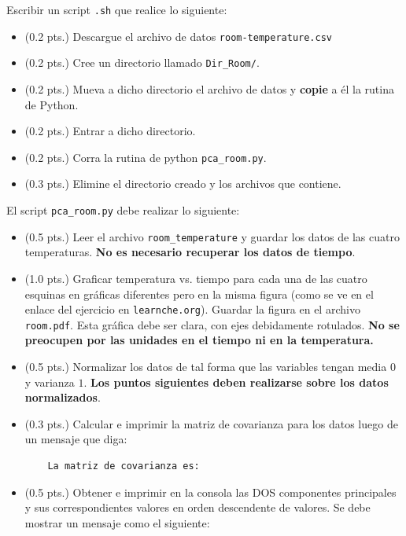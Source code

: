 \documentclass[11pt,letterpaper]{exam}
\begin{document}
\begin{questions}
 
\question[1.3]

Escribir un script \verb'.sh' que realice lo siguiente:

\begin{itemize}
	\item (0.2 pts.) Descargue el archivo de datos \verb'room-temperature.csv'
	\item (0.2 pts.) Cree un directorio llamado \verb'Dir_Room/'.
	\item (0.2 pts.) Mueva a dicho directorio el archivo de datos y \textbf{copie} a \'el la rutina de Python.
	\item (0.2 pts.) Entrar a dicho directorio.
	\item (0.2 pts.) Corra la rutina de python \verb'pca_room.py'.
	\item (0.3 pts.) Elimine el directorio creado y los archivos que contiene.
\end{itemize}

\question[4.7]

El script \verb'pca_room.py' debe realizar lo siguiente:

\begin{itemize}
	\item (0.5 pts.) Leer el archivo \verb'room_temperature' y guardar los datos de las cuatro temperaturas. \textbf{No es necesario recuperar los datos de tiempo}.
	\item (1.0 pts.) Graficar temperatura vs. tiempo para cada una de las cuatro esquinas en gr\'aficas diferentes pero en la misma figura (como se ve en el enlace del ejercicio en \verb'learnche.org'). Guardar la figura en el archivo \verb'room.pdf'. Esta gr\'afica debe ser clara, con ejes debidamente rotulados. \textbf{No se preocupen por las unidades en el tiempo ni en la temperatura.}
	\item (0.5 pts.) Normalizar los datos de tal forma que las variables tengan media $0$ y varianza $1$. \textbf{Los puntos siguientes deben realizarse sobre los datos normalizados}.
	\item (0.3 pts.) Calcular e imprimir la matriz de covarianza para los datos luego de un mensaje que diga:

\begin{verbatim}
	La matriz de covarianza es:
\end{verbatim}

	\item (0.5 pts.) Obtener e imprimir en la consola las DOS componentes principales y sus correspondientes valores en orden descendente de valores. Se debe mostrar un mensaje como el siguiente:


\end{itemize}
\end{questions}
\end{document}
